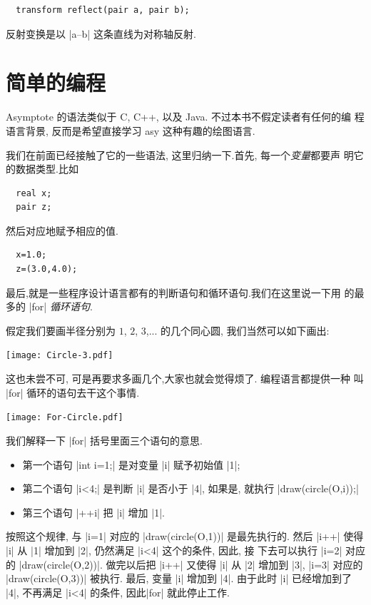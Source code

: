 \documentclass[nofonts,CJKnormalspaces]{ctexbook}[2009/05/20]
\begin{document}
\begin{lstlisting}
  transform reflect(pair a, pair b);
\end{lstlisting}
反射变换是以 |a--b| 这条直线为对称轴反射.


\section{简单的编程}
Asymptote 的语法类似于 C, C++, 以及 Java. 不过本书不假定读者有任何的编
程语言背景, 反而是希望直接学习 asy 这种有趣的绘图语言.

我们在前面已经接触了它的一些语法, 这里归纳一下.首先, 每一个\emph{变量}都要声
明它的数据类型.比如

\begin{lstlisting}
  real x;
  pair z;
\end{lstlisting}
然后对应地赋予相应的值.
\begin{lstlisting}
  x=1.0;
  z=(3.0,4.0);
\end{lstlisting}

最后,就是一些程序设计语言都有的判断语句和循环语句.我们在这里说一下用
的最多的 |for| \emph{循环语句}.

假定我们要画半径分别为 $1$, $2$, $3$,...
的几个同心圆, 我们当然可以如下画出:
\begin{center}\texttt{[image: Circle-3.pdf]}\end{center}%


这也未尝不可, 可是再要求多画几个,大家也就会觉得烦了. 编程语言都提供一种
叫 |for| 循环的语句去干这个事情.

\begin{center}\texttt{[image: For-Circle.pdf]}\end{center}%


我们解释一下 |for| 括号里面三个语句的意思.
\begin{itemize}
\item 第一个语句 |int i=1;| 是对变量 |i| 赋予初始值
  |1|;
\item 第二个语句 |i<4;| 是判断 |i| 是否小于 |4|,
  如果是, 就执行 |draw(circle(O,i));|
\item 第三个语句  |++i| 把 |i| 增加 |1|.
\end{itemize}

按照这个规律,  与 |i=1| 对应的 |draw(circle(O,1))| 是最先执行的. 然后
|i++| 使得 |i| 从 |1| 增加到 |2|, 仍然满足 |i<4| 这个的条件, 因此, 接
下去可以执行 |i=2| 对应的 |draw(circle(O,2))|. 做完以后把 |i++| 又使得
|i| 从 |2| 增加到 |3|, |i=3| 对应的 |draw(circle(O,3))| 被执行. 最后,
变量 |i| 增加到 |4|. 由于此时 |i| 已经增加到了 |4|, 不再满足 |i<4|
的条件, 因此|for| 就此停止工作.
\end{document}
